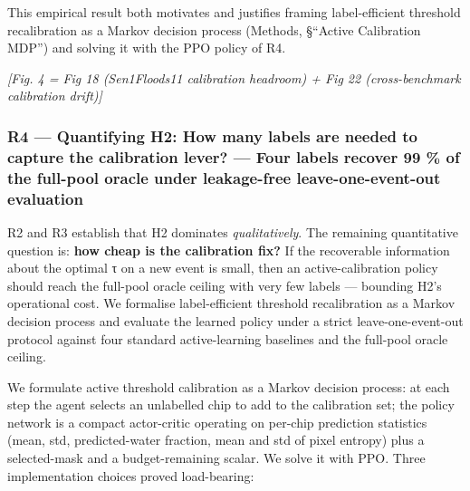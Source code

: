 This empirical result both motivates and justifies framing label-efficient
threshold recalibration as a Markov decision process (Methods, §``Active
Calibration MDP'') and solving it with the PPO policy of R4.

\emph{{[}Fig. 4 = Fig 18 (Sen1Floods11 calibration headroom) + Fig 22
(cross-benchmark calibration drift){]}}

\subsubsection{R4 --- Quantifying H2: How many labels are needed to capture the calibration lever? --- Four labels recover 99 \% of the full-pool oracle under leakage-free leave-one-event-out evaluation}\label{r4-quantifying-h2-how-many-labels-are-needed-to-capture-the-calibration-lever-four-labels-recover-99-of-the-full-pool-oracle-under-leakage-free-leave-one-event-out-evaluation}

R2 and R3 establish that H2 dominates \emph{qualitatively}. The remaining
quantitative question is: \textbf{how cheap is the calibration fix?} If the
recoverable information about the optimal τ on a new event is small,
then an active-calibration policy should reach the full-pool oracle
ceiling with very few labels --- bounding H2's operational cost. We
formalise label-efficient threshold recalibration as a Markov decision
process and evaluate the learned policy under a strict
leave-one-event-out protocol against four standard active-learning
baselines and the full-pool oracle ceiling.

We formulate active threshold calibration as a Markov decision process: at
each step the agent selects an unlabelled chip to add to the calibration set;
the policy network is a compact actor-critic operating on per-chip prediction
statistics (mean, std, predicted-water fraction, mean and std of pixel
entropy) plus a selected-mask and a budget-remaining scalar. We solve it
with PPO. Three implementation choices proved load-bearing:

